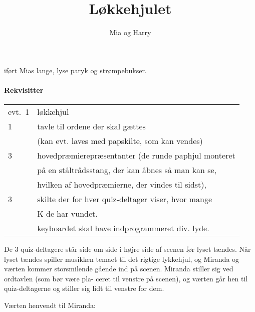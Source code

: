\documentclass[a4paper,11pt]{article}
\title{Løkkehjulet}
\author{Mia og Harry}
\begin{document}
\maketitle

\begin{roles}

 iført Mias lange, 
               lyse paryk og strømpebukser.
               

\end{roles}

\begin{sketch}




\paragraph{Rekvisitter}\strut

\begin{tabular}{ll}
evt.\ 1 & løkkehjul\\
             1 & tavle til ordene der skal gættes\\
               & (kan evt. laves med papskilte, som kan vendes)\\
             3 & hovedpræmierepræsentanter (de runde paphjul monteret\\
               & på en ståltrådsstang, der kan åbnes så man kan se,\\
               & hvilken af hovedpræmierne, der vindes til sidst),\\
             3 & skilte der for hver quiz-deltager viser, hvor mange\\
               & K de har vundet.\\
                &  keyboardet skal have indprogrammeret div. lyde.\\
\end{tabular}

\scene

De 3 quiz-deltagere står side om side i højre side af scenen før
lyset tændes. Når lyset tændes spiller musikken temaet til det
rigtige lykkehjul, og Miranda og værten kommer storsmilende gående
ind på scenen. Miranda stiller sig ved ordtavlen (som bør være pla-
ceret til venstre på scenen), og værten går hen til quiz-deltagerne
og stiller sig lidt til venstre for dem.

Værten henvendt til Miranda:


\end{sketch}
\end{document}
